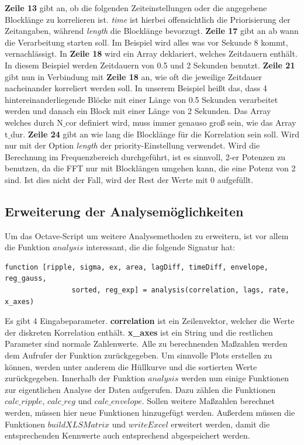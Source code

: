 \textbf{Zeile 13} gibt an, ob die folgenden Zeiteinstellungen oder die angegebene Blocklänge zu korrelieren ist. \textit{time} ist hierbei offensichtlich die Priorisierung der Zeitangaben, während \textit{length} die Blocklänge bevorzugt.\newline
\textbf{Zeile 17} gibt an ab wann die Verarbeitung starten soll. Im Beispiel wird alles was vor Sekunde 8 kommt, vernachlässigt. \newline
In \textbf{Zeile 18} wird ein Array deklariert, welches Zeitdauern enthält. In diesem Beispiel werden Zeitdauern von 0.5 und 2 Sekunden benutzt. \newline
\textbf{Zeile 21} gibt nun in Verbindung mit \textbf{Zeile 18} an, wie oft die jeweilige Zeitdauer nacheinander korreliert werden soll. In unserem Beispiel heißt das, dass 4 hintereinanderliegende Blöcke mit einer Länge von 0.5 Sekunden verarbeitet werden und danach ein Block mit einer Länge von 2 Sekunden. Das Array welches durch N$\_$cor definiert wird, muss immer genauso groß sein, wie das Array t$\_$dur.\newline
\textbf{Zeile 24} gibt an wie lang die Blocklänge für die Korrelation sein soll. Wird nur mit der Option \textit{length} der priority-Einstellung verwendet. Wird die Berechnung im Frequenzbereich durchgeführt, ist es sinnvoll, 2-er Potenzen zu benutzen, da die FFT nur mit Blocklängen umgehen kann, die eine Potenz von 2 sind. Ist dies nicht der Fall, wird der Rest der Werte mit 0 aufgefüllt.\newline

\subsection{Erweiterung der Analysemöglichkeiten}
Um das Octave-Script um weitere Analysemethoden zu erweitern, ist vor allem die Funktion $analysis$ interessant, die die folgende Signatur hat:
\begin{lstlisting}
function [ripple, sigma, ex, area, lagDiff, timeDiff, envelope, reg_gauss, 
                sorted, reg_exp] = analysis(correlation, lags, rate, x_axes)
\end{lstlisting}
Es gibt 4 Eingabeparameter. \textbf{correlation} ist ein Zeilenvektor, welcher die Werte der diskreten Korrelation enthält. \textbf{x_axes} ist ein String und die restlichen Parameter sind normale Zahlenwerte. Alle zu berechnenden Maßzahlen werden dem Aufrufer der Funktion zurückgegeben. Um sinnvolle Plots erstellen zu können, werden unter anderem die Hüllkurve und die sortierten Werte zurückgegeben.  
Innerhalb der Funktion $analysis$ werden nun einige Funktionen zur eigentlichen Analyse der Daten aufgerufen. Dazu zählen die Funktionen $calc\_ripple$, $calc\_reg$ und $calc\_envelope$. Sollen weitere Maßzahlen berechnet werden, müssen hier neue Funktionen hinzugefügt werden. Außerdem müssen die Funktionen $buildXLSMatrix$ und $writeExcel$ erweitert werden, damit die entsprechenden Kennwerte auch entsprechend abgespeichert werden.
